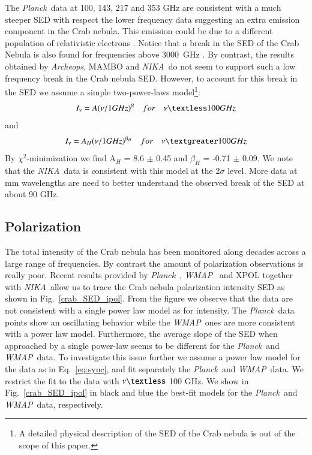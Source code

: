 \documentclass[twocolumn,traditabstract]{aa}
\def\NIKA{\textit{NIKA}}
\def\Planck{\textit{Planck}}
\def\WMAP{\textit{WMAP}}
\begin{document}
The \Planck\ data at 100, 143, 217 and 353 GHz are consistent with a much steeper SED with respect the lower frequency data suggesting an extra emission component in the Crab nebula. This emission could be due to a different population of relativistic electrons \citep{1965ARA&A...3..297G}. Notice that a break in the SED of the Crab Nebula is also found for frequencies above 3000~GHz \citep{macias2010}.
By contrast, the results obtained by {\it Archeops}, MAMBO and \NIKA\ do not seem to support such a low frequency break in the Crab nebula SED. However, to account for this break in the SED we assume a simple two-power-laws model\footnote{A detailed physical description of the SED of the Crab nebula is out of the scope of this paper.}:
\begin{equation}
I_{\nu} = A(\nu/1GHz)^{\beta} \quad for \quad \nu   \textless  100 GHz
\end{equation}
and 
\begin{equation}
I_{\nu} = A_{H}(\nu/1GHz)^{\beta_H} \quad for \quad \nu   \textgreater  100 GHz
\end{equation}
By $\chi^2$-minimization we find
A$_H$ = 8.6 $\pm$ 0.45 and $\beta_H$ = -0.71 $\pm$ 0.09.
We note that the \NIKA\ data is consistent with this model at the 2$\sigma$ level. More data at mm wavelengths are need to better understand the observed break of the SED at about 90 GHz. 


\subsection{Polarization}
The total intensity of the Crab nebula has been monitored along decades across a large range of frequencies. By contrast the amount of polarization observations is really poor.
Recent results provided by \Planck\ \citep{2015arXiv150702058P}, \WMAP\ \citep{2011ApJS..192...19W} and XPOL \citep{aumont2010} together with \NIKA\ allow us to trace the Crab nebula polarization intensity SED as shown in Fig.~\ref{crab_SED_ipol}. 
From the figure we observe that the data are not consistent with a single power law model as for intensity. 
The \Planck\ data points show an oscillating behavior while the \WMAP\ ones are more consistent with a power law model. Furthermore, the average slope of the SED when approached by a single power-law seems to be different for the \Planck\ and \WMAP\ data.
To investigate this issue further we assume a power law model for the data as in Eq.~\ref{eq:sync}, and fit separately the \Planck\ and \WMAP\ data. We restrict the fit to the data with $\nu \textless$ 100 GHz. We show in Fig.~\ref{crab_SED_ipol} in black and blue the best-fit models for the \Planck\ and \WMAP\ data, respectively.
\end{document}
